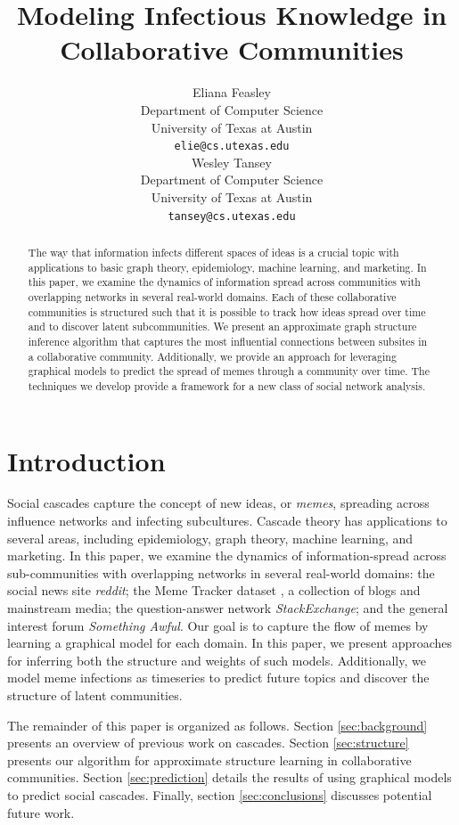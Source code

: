\documentclass{article} %
\title{Modeling Infectious Knowledge in Collaborative Communities}
\author{
Eliana Feasley\\
Department of Computer Science\\
University of Texas at Austin\\
\texttt{elie@cs.utexas.edu} \\
\And
Wesley Tansey\\
Department of Computer Science\\
University of Texas at Austin\\
\texttt{tansey@cs.utexas.edu} \\
}
\begin{document}
\maketitle

\begin{abstract}
The way that information infects different spaces of ideas is a crucial topic with applications to basic graph theory, epidemiology, machine learning, and marketing. In this paper, we examine the dynamics of information spread across communities with overlapping networks in several real-world domains. Each of these collaborative communities is structured such that it is possible to track how ideas spread over time and to discover latent subcommunities. We present an approximate graph structure inference algorithm that captures the most influential connections between subsites in a collaborative community. Additionally, we provide an approach for leveraging graphical models to predict the spread of memes through a community over time. The techniques we develop provide a framework for a new class of social network analysis.
\end{abstract}

\section{Introduction}
\label{intro}
Social cascades capture the concept of new ideas, or \textit{memes}, spreading across influence networks and infecting subcultures. Cascade theory has applications to several areas, including epidemiology, graph theory, machine learning, and marketing. In this paper, we examine the dynamics of information-spread across sub-communities with overlapping networks in several real-world domains: the social news site \textit{reddit}; the Meme Tracker dataset \cite{memetracker}, a collection of blogs and mainstream media; the question-answer network \textit{StackExchange}; and the general interest forum \textit{Something Awful}. Our goal is to capture the flow of memes by learning a graphical model for each domain. In this paper, we present approaches for inferring both the structure and weights of such models. Additionally, we model meme infections as timeseries to predict future topics and discover the structure of latent communities.

The remainder of this paper is organized as follows. Section \ref{sec:background} presents an overview of previous work on cascades. Section \ref{sec:structure} presents our algorithm for approximate structure learning in collaborative communities. Section \ref{sec:prediction} details the results of using graphical models to predict social cascades. Finally, section \ref{sec:conclusions} discusses potential future work.
\end{document}
